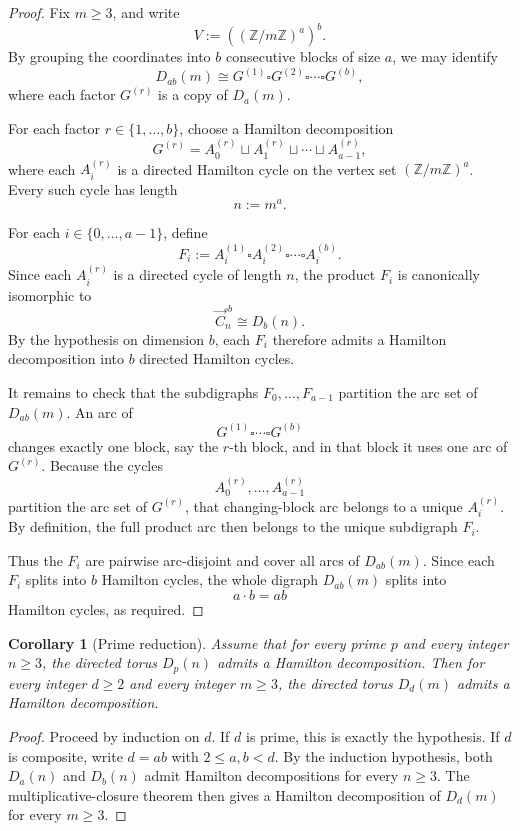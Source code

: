 \documentclass[11pt]{article}
\newtheorem{corollary}[proposition]{Corollary}
\newcommand{\torus}[2]{D_{#1}(#2)}
\newcommand{\cycle}[1]{\vec C_{#1}}
\begin{document}
\begin{proof}
Fix $m \ge 3$, and write
\[
V:=((\mathbb Z/m\mathbb Z)^a)^b.
\]
By grouping the coordinates into $b$ consecutive blocks of size $a$, we may
identify
\[
\torus{ab}{m}
\cong
G^{(1)} \square G^{(2)} \square \cdots \square G^{(b)},
\]
where each factor $G^{(r)}$ is a copy of $\torus{a}{m}$.

For each factor $r \in \{1,\dots,b\}$, choose a Hamilton decomposition
\[
G^{(r)} = A_0^{(r)} \sqcup A_1^{(r)} \sqcup \cdots \sqcup A_{a-1}^{(r)},
\]
where each $A_i^{(r)}$ is a directed Hamilton cycle on the vertex set
$(\mathbb Z/m\mathbb Z)^a$. Every such cycle has length
\[
n := m^a.
\]

For each $i \in \{0,\dots,a-1\}$, define
\[
F_i := A_i^{(1)} \square A_i^{(2)} \square \cdots \square A_i^{(b)}.
\]
Since each $A_i^{(r)}$ is a directed cycle of length $n$, the product $F_i$ is
canonically isomorphic to
\[
\cycle{n}^{\square b} \cong \torus{b}{n}.
\]
By the hypothesis on dimension $b$, each $F_i$ therefore admits a Hamilton
decomposition into $b$ directed Hamilton cycles.

It remains to check that the subdigraphs $F_0,\dots,F_{a-1}$ partition the arc
set of $\torus{ab}{m}$. An arc of
\[
G^{(1)} \square \cdots \square G^{(b)}
\]
changes exactly one block, say the $r$-th block, and in that block it uses one
arc of $G^{(r)}$. Because the cycles
\[
A_0^{(r)},\dots,A_{a-1}^{(r)}
\]
partition the arc set of $G^{(r)}$, that changing-block arc belongs to a unique
$A_i^{(r)}$. By definition, the full product arc then belongs to the unique
subdigraph $F_i$.

Thus the $F_i$ are pairwise arc-disjoint and cover all arcs of $\torus{ab}{m}$.
Since each $F_i$ splits into $b$ Hamilton cycles, the whole digraph
$\torus{ab}{m}$ splits into
\[
a \cdot b = ab
\]
Hamilton cycles, as required.
\end{proof}

\begin{corollary}[Prime reduction]
Assume that for every prime $p$ and every integer $n \ge 3$, the directed torus
$\torus{p}{n}$ admits a Hamilton decomposition. Then for every integer $d \ge 2$
and every integer $m \ge 3$, the directed torus $\torus{d}{m}$ admits a
Hamilton decomposition.
\end{corollary}

\begin{proof}
Proceed by induction on $d$. If $d$ is prime, this is exactly the hypothesis.
If $d$ is composite, write $d=ab$ with $2 \le a,b < d$. By the induction
hypothesis, both $\torus{a}{n}$ and $\torus{b}{n}$ admit Hamilton
decompositions for every $n \ge 3$. The multiplicative-closure theorem then
gives a Hamilton decomposition of $\torus{d}{m}$ for every $m \ge 3$.
\end{proof}
\end{document}
